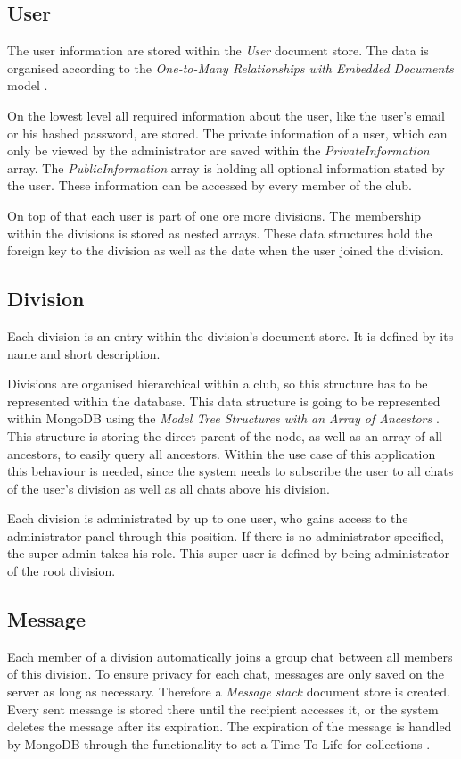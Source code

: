 \subsection{User}
The user information are stored within the \emph{User} document store. The data is organised according to the \emph{One-to-Many Relationships with Embedded Documents} model \cite[p. 141]{Mongo:2014aa}.

On the lowest level all required information about the user, like the user's email or his hashed password, are stored. The private information of a user, which can only be viewed by the administrator are saved within the \emph{PrivateInformation} array. The \emph{PublicInformation} array is holding all optional information stated by the user. These information can be accessed by every member of the club.

On top of that each user is part of one ore more divisions. The membership within the divisions is stored as nested arrays. These data structures hold the foreign key to the division as well as the date when the user joined the division.

\subsection{Division}
Each division is an entry within the division's document store. It is defined by its name and short description.

Divisions are organised hierarchical within a club, so this structure has to be represented within the database. This data structure is going to be represented within MongoDB using the \emph{Model Tree Structures with an Array of Ancestors} \cite[p. 149]{Mongo:2014aa}. This structure is storing the direct parent of the node, as well as an array of all ancestors, to easily query all ancestors. Within the use case of this application this behaviour is needed, since the system needs to subscribe the user to all chats of the user's division as well as all chats above his division.

Each division is administrated by up to one user, who gains access to the administrator panel through this position. If there is no administrator specified, the super admin takes his role. This super user is defined by being administrator of the root division.

\subsection{Message}
Each member of a division automatically joins a group chat between all members of this division. To ensure privacy for each chat, messages are only saved on the server as long as necessary. Therefore a \emph{Message stack} document store is created. Every sent message is stored there until the recipient accesses it, or the system deletes the message after its expiration. The expiration of the message is handled by MongoDB through the functionality to set a Time-To-Life for collections \cite[p. 198]{Mongo:2014aa}.

